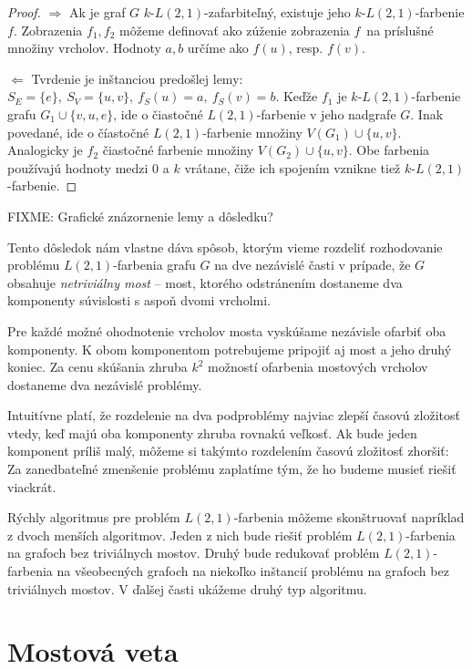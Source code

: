 \begin{proof}
    $\boxed{\Rightarrow}$
        Ak je graf $G$ $k$-$L(2,1)$-zafarbiteľný, existuje jeho $k$-$L(2,1)$-farbenie $f$. Zobrazenia $f_1, f_2$ môžeme
        definovať ako zúženie zobrazenia $f$ na príslušné množiny vrcholov. Hodnoty $a, b$ určíme ako $f(u)$, resp. $f(v)$.

    $\boxed{\Leftarrow}$
        Tvrdenie je inštanciou predošlej lemy: $S_E = \{e\},\ S_V = \{u,v\},\ f_S(u) = a,\ f_S(v) = b$. Keďže $f_1$
        je $k$-$L(2,1)$-farbenie grafu $G_1 \cup \{v, u, e\}$, ide o čiastočné $L(2,1)$-farbenie v jeho nadgrafe $G$.
        Inak povedané, ide o číastočné $L(2,1)$-farbenie množiny $V(G_1) \cup \{u, v\}$. Analogicky je $f_2$ čiastočné
        farbenie množiny $V(G_2) \cup \{u,v\}$. Obe farbenia používajú hodnoty medzi $0$ a $k$ vrátane, čiže ich
        spojením vznikne tiež $k$-$L(2,1)$-farbenie.
\end{proof}

FIXME: Grafické znázornenie lemy a dôsledku? %

Tento dôsledok nám vlastne dáva spôsob, ktorým vieme rozdeliť rozhodovanie
problému $L(2,1)$-farbenia grafu $G$ na dve nezávislé časti v prípade,
že $G$ obsahuje \emph{netriviálny most} -- most, ktorého odstránením dostaneme
dva komponenty súvislosti s aspoň dvomi vrcholmi.

Pre každé možné ohodnotenie vrcholov mosta vyskúšame nezávisle ofarbiť oba
komponenty. K obom komponentom potrebujeme pripojiť aj most a jeho druhý koniec. Za cenu
skúšania zhruba $k^2$ možností ofarbenia mostových vrcholov dostaneme dva nezávislé
problémy.

Intuitívne platí, že rozdelenie na dva podproblémy
najviac zlepší časovú zložitosť vtedy, keď majú oba komponenty zhruba rovnakú veľkosť.
Ak bude jeden komponent príliš malý, môžeme si takýmto rozdelením časovú zložitosť zhoršiť:
Za zanedbateľné zmenšenie problému zaplatíme tým, že ho budeme musieť riešiť viackrát.

Rýchly algoritmus pre problém $L(2,1)$-farbenia môžeme skonštruovať napríklad z dvoch menších
algoritmov. Jeden z nich bude riešiť problém $L(2,1)$-farbenia na grafoch bez triviálnych mostov.
Druhý bude redukovať problém $L(2,1)$-farbenia na všeobecných grafoch na niekoľko inštancií
problému na grafoch bez triviálnych mostov. V ďalšej časti ukážeme druhý typ algoritmu.

\section{Mostová veta}

